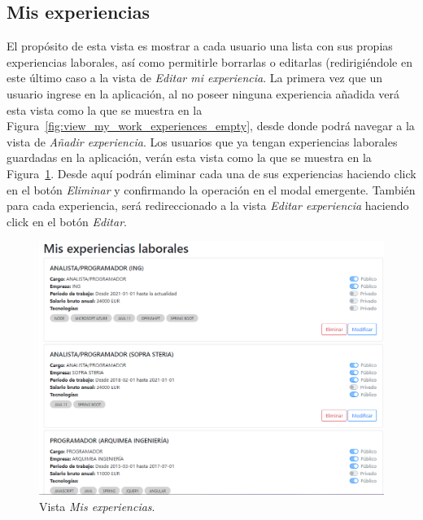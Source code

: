 \documentclass[a4paper, 12pt]{book}
\begin{document}
    \subsection{Mis experiencias}
    \label{subsec:view_my_work_experiences}
    El propósito de esta vista es mostrar a cada usuario una lista con sus propias experiencias laborales,
    así como permitirle borrarlas o editarlas (redirigiéndole en este último caso a la vista de \emph{Editar mi experiencia}.
    La primera vez que un usuario ingrese en la aplicación, al no poseer ninguna experiencia añadida verá esta vista como la que se muestra en la Figura~\ref{fig:view_my_work_experiences_empty}, desde donde podrá navegar a la vista de \emph{Añadir experiencia}.
    Los usuarios que ya tengan experiencias laborales guardadas en la aplicación, verán esta vista como la que se muestra en la Figura~\ref{fig:view_my_work_experiences}. Desde aquí podrán eliminar cada una de sus experiencias haciendo click en el botón \emph{Eliminar} y confirmando la operación en el modal emergente.
    También para cada experiencia, será redireccionado a la vista \emph{Editar experiencia} haciendo click en el botón \emph{Editar}.

    \begin{figure}
        \centering
        \includegraphics[width=15cm, keepaspectratio]{img/my_we.PNG}
        \caption{Vista \emph{Mis experiencias}.}\label{fig:view_my_work_experiences}
    \end{figure}
\end{document}
